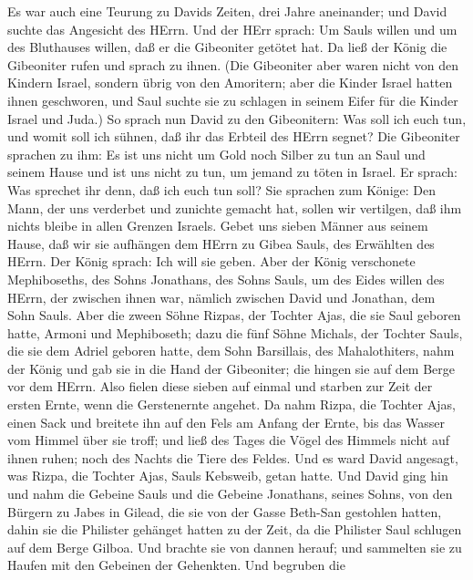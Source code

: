  Es war auch eine Teurung zu Davids Zeiten, drei Jahre
aneinander; und David suchte das Angesicht des HErrn. Und der HErr
sprach: Um Sauls willen und um des Bluthauses willen, daß er die
Gibeoniter getötet hat.  Da ließ der König die Gibeoniter
rufen und sprach zu ihnen. (Die Gibeoniter aber waren nicht von den
Kindern Israel, sondern übrig von den Amoritern; aber die Kinder Israel
hatten ihnen geschworen, und Saul suchte sie zu schlagen in seinem Eifer
für die Kinder Israel und Juda.)  So sprach nun David zu den
Gibeonitern: Was soll ich euch tun, und womit soll ich sühnen, daß ihr
das Erbteil des HErrn segnet?  Die Gibeoniter sprachen zu
ihm: Es ist uns nicht um Gold noch Silber zu tun an Saul und seinem
Hause und ist uns nicht zu tun, um jemand zu töten in Israel. Er sprach:
Was sprechet ihr denn, daß ich euch tun soll?  Sie sprachen
zum Könige: Den Mann, der uns verderbet und zunichte gemacht hat, sollen
wir vertilgen, daß ihm nichts bleibe in allen Grenzen Israels.
 Gebet uns sieben Männer aus seinem Hause, daß wir sie
aufhängen dem HErrn zu Gibea Sauls, des Erwählten des HErrn. Der König
sprach: Ich will sie geben.  Aber der König verschonete
Mephiboseths, des Sohns Jonathans, des Sohns Sauls, um des Eides willen
des HErrn, der zwischen ihnen war, nämlich zwischen David und Jonathan,
dem Sohn Sauls.  Aber die zween Söhne Rizpas, der Tochter
Ajas, die sie Saul geboren hatte, Armoni und Mephiboseth; dazu die fünf
Söhne Michals, der Tochter Sauls, die sie dem Adriel geboren hatte, dem
Sohn Barsillais, des Mahalothiters, nahm der König  und gab
sie in die Hand der Gibeoniter; die hingen sie auf dem Berge vor dem
HErrn. Also fielen diese sieben auf einmal und starben zur Zeit der
ersten Ernte, wenn die Gerstenernte angehet.  Da nahm
Rizpa, die Tochter Ajas, einen Sack und breitete ihn auf den Fels am
Anfang der Ernte, bis das Wasser vom Himmel über sie troff; und ließ des
Tages die Vögel des Himmels nicht auf ihnen ruhen; noch des Nachts die
Tiere des Feldes.  Und es ward David angesagt, was Rizpa,
die Tochter Ajas, Sauls Kebsweib, getan hatte.  Und David
ging hin und nahm die Gebeine Sauls und die Gebeine Jonathans, seines
Sohns, von den Bürgern zu Jabes in Gilead, die sie von der Gasse
Beth-San gestohlen hatten, dahin sie die Philister gehänget hatten zu
der Zeit, da die Philister Saul schlugen auf dem Berge Gilboa.
 Und brachte sie von dannen herauf; und sammelten sie zu
Haufen mit den Gebeinen der Gehenkten.  Und begruben die
